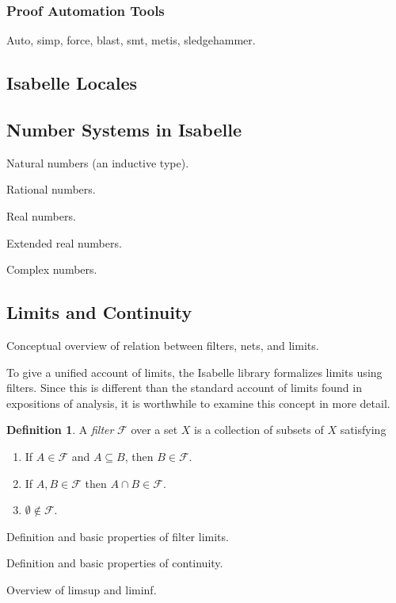 \documentclass{amsart}
\theoremstyle{definition}
\newtheorem{definition}[theorem]{Definition}
\theoremstyle{remark}
\begin{document}
\subsubsection{Proof Automation Tools}

Auto, simp, force, blast, smt, metis, sledgehammer.

\subsection{Isabelle Locales}

\subsection{Number Systems in Isabelle}

Natural numbers (an inductive type).

Rational numbers.

Real numbers.

Extended real numbers.

Complex numbers.

\subsection{Limits and Continuity}

Conceptual overview of relation between filters, nets, and limits.

To give a unified account of limits, the Isabelle library formalizes limits using filters. Since this is different than the standard account of limits found in expositions of analysis, it is worthwhile to examine this concept in more detail.

\begin{definition}
A {\em filter} $\mathcal F$ over a set $X$ is a collection of subsets of $X$ satisfying
\begin{enumerate}
\item If $A \in \mathcal F$ and $A \subseteq B$, then $B \in \mathcal F$.
\item If $A, B \in \mathcal F$ then $A \cap B \in \mathcal F$.
\item $\emptyset \notin \mathcal F$.
\end{enumerate}
\end{definition}

Definition and basic properties of filter limits.

Definition and basic properties of continuity.

Overview of limsup and liminf.
\end{document}
